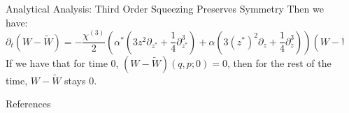 \documentclass[final]{beamer}
\newlength{\sepwidth}
\newlength{\colwidth}
\newcommand{\separatorcolumn}{\begin{column}{\sepwidth}\end{column}}
\begin{document}
\begin{frame}[t]
\begin{columns}[t]
\begin{column}{\colwidth}
\begin{block}{Analytical Analysis: Third Order Squeezing Preserves Symmetry}
        Then we have:
        \[\partial_{t}(W-\tilde{W})=-\frac{\chi^{(3)}}{2}\left(\alpha^{*}\left(3z^{2}\partial_{z^{*}}+\frac{1}{4}\partial_{z^{*}}^{3}\right)+\alpha\left(3(z^{*})^{2}\partial_{z}+\frac{1}{4}\partial_{z}^{3}\right)\right)(W-\tilde{W})\]
        If we have that for time $0$, $(W-\tilde{W})(q,p;0)=0$, then for the rest of the time, $W-\tilde{W}$ stays $0$.      \end{block}

      \begin{block}{References}
        \nocite{*}
        \footnotesize{}
      \end{block}

    \end{column}

    \separatorcolumn
  \end{columns}
\end{frame}
\end{document}

